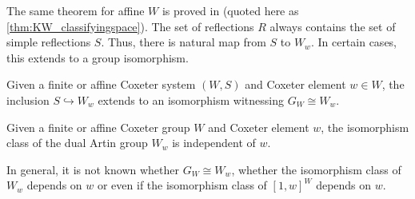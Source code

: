 \documentclass[class=article, crop=false]{standalone}
\begin{document}
The same theorem for affine $W$ is proved in \cite{paolini_salvetti_kpi1_2021} (quoted here as \cref{thm:KW_classifyingspace}). The set of reflections $R$ always contains the set of simple reflections $S$. Thus, there is natural map from $S$ to $W_w$. In certain cases, this extends to a group isomorphism.

\begin{theorem}
    Given a finite \cite[Theorem 2.2.5]{bessis_dual_2003} or affine \cite[Theorem C]{mccammond_sulway_artin_2017} Coxeter system $(W,S)$ and Coxeter element $w \in W$, the inclusion $S \hookrightarrow W_w$ extends to an isomorphism witnessing $G_W \cong W_w$.
    \label{thm:dual_artin_iso_artin}
\end{theorem}
\begin{corollary}
    Given a finite or affine Coxeter group $W$ and Coxeter element $w$, the isomorphism class of the dual Artin group $W_w$ is independent of $w$.
\end{corollary}

In general, it is not known whether $G_W \cong W_w$, whether the isomorphism class of $W_w$ depends on $w$ or even if the isomorphism class of $[1,w]^W$ depends on $w$.
\end{document}
